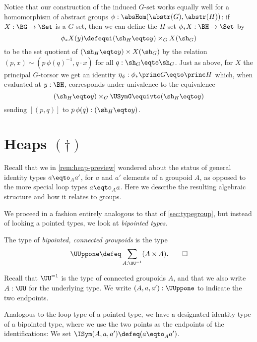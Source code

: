 \begin{remark}
  \label{rem:inducedGsetfromabstracthomomorphisms} 
  Notice that our construction of the induced $G$-set works equally well for
  a homomorphism of abstract groups $\phi:\absHom(\abstr(G),\abstr(H))$:
  if $X:\BG\to\Set$ is a $G$-set, then we can
  define the $H$-set $\phi_*X:\BH\to\Set$ by
  \[
    \phi_*X(y)\defequi (\sh_H \eqto y) \times_G X(\sh_G)
  \]
  to be the set quotient of $(\sh_H\eqto y)\times X(\sh_G)$ by
  the relation
  $(p,x)\sim(p\, \phi(q)^{-1},q\cdot x)$ for all $q:\sh_G\eqto\sh_G$.
  Just as above, for $X$ the principal $G$-torsor we get an identity
  $\eta_\phi:\phi_*\princ G \eqto \princ H$ which, when evaluated at $y:\BH$,
  corresponds under univalence to the equivalence
  \[
    (\sh_H\eqto y)\times_G\USymG\equivto (\sh_H\eqto y)
  \]
  sending $[(p,q)]$ to $p\,\phi(q):(\sh_H\eqto y)$.
\end{remark}

\section{Heaps \texorpdfstring{$(\dagger)$}{(\textdagger) \color{red} just moved from symmetry without proofreading BID211116}}
\label{sec:heaps}

Recall that we in \cref{rem:heap-preview} wondered about
the status of general identity types $a\eqto_A a'$,
for $a$ and $a'$ elements of a groupoid $A$,
as opposed to the more special loop types $a\eqto_Aa$.
Here we describe the resulting algebraic structure
and how it relates to groups.

We proceed in a fashion entirely analogous to that of \cref{sec:typegroup},
but instead of looking a pointed types, we look at \emph{bipointed types}.

\begin{definition}\label{def:bipt-conn-groupoid}
  The type of \emph{bipointed, connected groupoids} is the type
  \[
    \UUppone \defeq \sum_{A:\UU^{=1}}(A \times A).\qedhere
  \]
\end{definition}
Recall that $\UU^{=1}$ is the type of connected groupoids $A$,
and that we also write $A:\UU$ for the underlying type.
We write $(A,a,a'):\UUppone$ to indicate the two endpoints.

Analogous to the loop type of a pointed type,
we have a designated identity type of a bipointed type,
where we use the two points as the endpoints of the identifications:
We set $\ISym(A,a,a') \defeq (a \eqto_A a')$.

